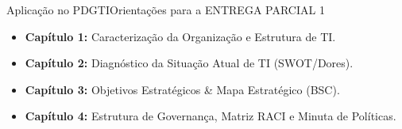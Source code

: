 \begin{senaiframe}{Aplicação no PDGTI}{Orientações para a ENTREGA PARCIAL 1}
  \vspace{0.5cm}
  \begin{tcolorbox}[senaigreencard, title={Entrega Parcial 1 (Capítulos 1 a 4) – Data: 04/Set}]
    \begin{itemize}
      \item \textbf{Capítulo 1:} Caracterização da Organização e Estrutura de TI.
      \item \textbf{Capítulo 2:} Diagnóstico da Situação Atual de TI (SWOT/Dores).
      \item \textbf{Capítulo 3:} Objetivos Estratégicos \& Mapa Estratégico (BSC).
      \item \textbf{Capítulo 4:} Estrutura de Governança, Matriz RACI e Minuta de Políticas.
    \end{itemize}
  \end{tcolorbox}
\end{senaiframe}
